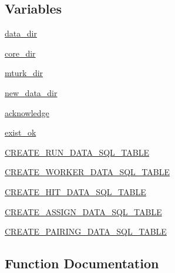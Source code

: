 \subsection*{Variables}
\begin{DoxyCompactItemize}
\item 
\hyperlink{namespaceparlai_1_1mturk_1_1core_1_1mturk__data__handler_a2f7d42b72f26357bf0939d23695604e8}{data\+\_\+dir}
\item 
\hyperlink{namespaceparlai_1_1mturk_1_1core_1_1mturk__data__handler_a8006ff4941c7804160312bc362820e97}{core\+\_\+dir}
\item 
\hyperlink{namespaceparlai_1_1mturk_1_1core_1_1mturk__data__handler_ac73b24261e8fd0c7cf04c221db3bfd6f}{mturk\+\_\+dir}
\item 
\hyperlink{namespaceparlai_1_1mturk_1_1core_1_1mturk__data__handler_a49829a6a392d6975e37c5fb375688fdb}{new\+\_\+data\+\_\+dir}
\item 
\hyperlink{namespaceparlai_1_1mturk_1_1core_1_1mturk__data__handler_a2a3b9b1990945eb35021d48ba28f0dcb}{acknowledge}
\item 
\hyperlink{namespaceparlai_1_1mturk_1_1core_1_1mturk__data__handler_af54f914df9420867e3e860b40f25792d}{exist\+\_\+ok}
\item 
\hyperlink{namespaceparlai_1_1mturk_1_1core_1_1mturk__data__handler_a144b8e7e28982cdf082443e14448bc3b}{C\+R\+E\+A\+T\+E\+\_\+\+R\+U\+N\+\_\+\+D\+A\+T\+A\+\_\+\+S\+Q\+L\+\_\+\+T\+A\+B\+LE}
\item 
\hyperlink{namespaceparlai_1_1mturk_1_1core_1_1mturk__data__handler_a841bd9bfbb0c315f09bcb90b8971eb75}{C\+R\+E\+A\+T\+E\+\_\+\+W\+O\+R\+K\+E\+R\+\_\+\+D\+A\+T\+A\+\_\+\+S\+Q\+L\+\_\+\+T\+A\+B\+LE}
\item 
\hyperlink{namespaceparlai_1_1mturk_1_1core_1_1mturk__data__handler_a89034c95b9165ffbb09c2103eb79b2de}{C\+R\+E\+A\+T\+E\+\_\+\+H\+I\+T\+\_\+\+D\+A\+T\+A\+\_\+\+S\+Q\+L\+\_\+\+T\+A\+B\+LE}
\item 
\hyperlink{namespaceparlai_1_1mturk_1_1core_1_1mturk__data__handler_a9cabd53fa80d2b331f95bc381006424b}{C\+R\+E\+A\+T\+E\+\_\+\+A\+S\+S\+I\+G\+N\+\_\+\+D\+A\+T\+A\+\_\+\+S\+Q\+L\+\_\+\+T\+A\+B\+LE}
\item 
\hyperlink{namespaceparlai_1_1mturk_1_1core_1_1mturk__data__handler_a78f345ea589a727ab5950c8c2b492f25}{C\+R\+E\+A\+T\+E\+\_\+\+P\+A\+I\+R\+I\+N\+G\+\_\+\+D\+A\+T\+A\+\_\+\+S\+Q\+L\+\_\+\+T\+A\+B\+LE}
\end{DoxyCompactItemize}


\subsection{Function Documentation}
\mbox{\label{namespaceparlai_1_1mturk_1_1core_1_1mturk__data__handler_a28ec50366a486cded72d95c9be461c2f}} 
